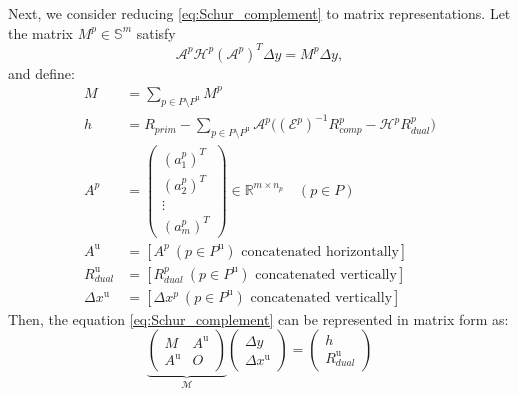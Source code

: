 Next, we consider reducing \eqref{eq:Schur_complement} to matrix representations. 
Let the matrix $M^p \in \mathbb{S}^{m}$ satisfy
\[
    \mathcal{A}^p\mathcal{H}^p(\mathcal{A}^p)^T \Delta y= M^p \Delta y,
\]
and define:
\begin{align*}
    M &= \sum_{p \in P \setminus P^{\text{u}}} M^p \\
    h &= R_{prim} - \sum_{p \in P \setminus P^{\text{u}}} \mathcal{A}^p\big((\mathcal{E}^p)^{-1}R_{comp}^p - \mathcal{H}^p R_{dual}^p\big)\\
    A^p &= \begin{pmatrix}
        (a^p_1)^T\\
        (a^p_2)^T\\
        \vdots\\
        (a^p_m)^T
    \end{pmatrix} \in \mathbb{R}^{m\times n_p} \quad (p\in P)\\
    A^{\text{u}} &= [ A^p ~ (p\in P^{\text{u}})\text{ concatenated horizontally} ]\\
    R^{\text{u}}_{dual} &= [ R^p_{dual} ~ (p\in P^{\text{u}})\text{ concatenated vertically} ]\\
    \Delta x^{\text{u}} &= [ \Delta x^p ~ (p\in P^{\text{u}})\text{ concatenated vertically} ]
\end{align*}
Then, the equation \eqref{eq:Schur_complement} can be represented in matrix form as:
\begin{equation}
    \underbrace{\left(\begin{array}{cc}
        M   & A^{\text{u}} \\
        A^{\text{u}} & O
    \end{array}\right)}_{\mathcal{M}}
    \left(\begin{array}{c}
        \Delta y   \\
        \Delta x^{\text{u}} 
    \end{array}\right) 
    = 
    \left(\begin{array}{c}
         h  \\
         R_{dual}^{\text{u}} 
    \end{array}
    \right)
    \label{eq:Schur_complement_Mat}
\end{equation}

